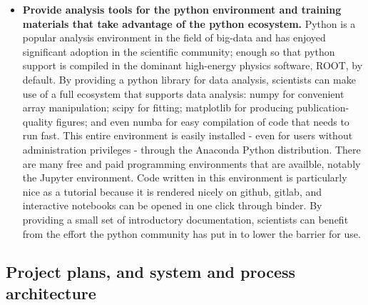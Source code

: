\begin{itemize}
    \item \textbf{Provide analysis tools for the python environment and training materials that take advantage of the python ecosystem.}  Python is a popular analysis environment in the field of big-data and has enjoyed significant adoption in the scientific community; enough so that python support is compiled in the dominant high-energy physics software, ROOT, by default.  By providing a python library for data analysis, scientists can make use of a full ecosystem that supports data analysis: numpy for convenient array manipulation; scipy for fitting; matplotlib for producing publication-quality figures; and even numba for easy compilation of code that needs to run fast.  This entire environment is easily installed - even for users without administration privileges - through the Anaconda Python distribution.  There are many free and paid programming environments that are availble, notably the Jupyter environment.  Code written in this environment is particularly nice as a tutorial because it is rendered nicely on github, gitlab, and interactive notebooks can be opened in one click through binder.  By providing a small set of introductory documentation, scientists can benefit from the effort the python community has put in to lower the barrier for use.
    
\end{itemize}

\subsection{Project plans, and system and process architecture}

